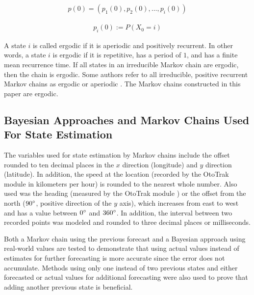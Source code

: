 \documentclass[preprint,12pt]{elsarticle}
\begin{document}
\begin{equation} \label{eqn4}
    \begin{aligned}
     p(0)=(p_{1}(0),p_{2}(0), \dots, p_{i}(0))
    \end{aligned}
\end{equation}  

\begin{equation} \label{eqn5}
    \begin{aligned}
     p_{i}(0):=P(X_{0}=i)
    \end{aligned}
\end{equation}  

A state $i$ is called ergodic if it is aperiodic and positively recurrent. In other words, a state $i$ is ergodic if it is repetitive, has a period of $1$, and has a finite mean recurrence time. If all states in an irreducible Markov chain are ergodic, then the chain is ergodic. Some authors refer to all irreducible, positive recurrent Markov chains as ergodic or aperiodic \citep{Parzen1962-oe}. The Markov chains constructed in this paper are ergodic.

\subsection{Bayesian Approaches and Markov Chains Used For State Estimation}

The variables used for state estimation by Markov chains include the offset rounded to ten decimal places in the $x$ direction (longitude) and $y$ direction (latitude). In addition, the speed at the location (recorded by the OtoTrak module  \cite{ototrakOtoTrakTrack} in kilometers per hour) is rounded to the nearest whole number. Also used was the heading (measured by the OtoTrak module  \cite{ototrakOtoTrakTrack}) or the offset from the north ($90\degree$, positive direction of the $y$ axis), which increases from east to west and has a value between $0\degree$ and $360\degree$. In addition, the interval between two recorded points was modeled and rounded to three decimal places or milliseconds.

Both a Markov chain using the previous forecast and a Bayesian approach using real-world values are tested to demonstrate that using actual values instead of estimates for further forecasting is more accurate since the error does not accumulate. Methods using only one instead of two previous states and either forecasted or actual values for additional forecasting were also used to prove that adding another previous state is beneficial.
\end{document}

